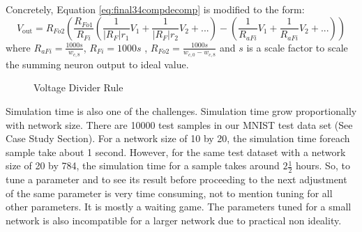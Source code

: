 Concretely, Equation \ref{eq:final34compdecomp} is modified to the form:
$$V_{\text{out}}=R_{Fo2}\left(\frac{R_{Fo1}}{R_{Fi}} \left(\frac{1}{\left| R_F\right|r_1}V_1+\frac{1}{\left| R_F\right|r_2}V_2+... \right)-\left(\frac{1}{R_{aFi}}V_1+\frac{1}{R_{aFi}}V_2+... \right)\right)$$
where $R_{aFi}=\frac{1000s}{w_{c,8}}$, $R_{Fi}=1000s$ , $R_{Fo2}=\frac{1000s}{w_{c,0}-w_{c,8}}$  and $s$ is a scale factor to scale the summing neuron output to ideal value.
\begin{figure}[H]
	\centering
	\caption{Voltage Divider Rule}
	\label{fig:vgnd}
\end{figure}
Simulation time is also one of the challenges. Simulation time grow proportionally with network size. There are 10000 test samples in our MNIST test data set (See Case Study Section). For a network size of 10 by 20, the simulation time foreach sample take about 1 second. However, for the same test dataset with a network size of 20 by 784, the simulation time for a sample takes around $2\frac{1}{2}$ hours. So, to tune a parameter and to see its result before proceeding to the next adjustment of the same parameter is very time consuming, not to mention tuning for all other parameters. It is mostly a waiting game. The parameters tuned for a small network is also incompatible for a larger network due to practical non ideality.
